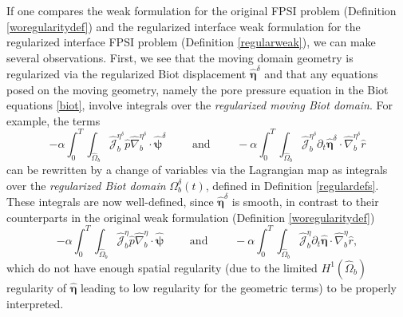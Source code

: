 \documentclass[11pt]{article}
\newcommand{\bd}{\boldsymbol}
\theoremstyle{definition}
\begin{document}
If one compares the weak formulation for the original FPSI problem (Definition \ref{woregularitydef}) and the regularized interface weak formulation for the regularized interface FPSI problem (Definition \ref{regularweak}), we can make several observations. First, we see that the moving domain geometry is regularized via the regularized Biot displacement $\hat{\bd{\eta}}^{\delta}$ and that any equations posed on the moving geometry, namely the pore pressure equation in the Biot equations \eqref{biot}, involve integrals over the \textit{regularized moving Biot domain}. For example, the terms 
\begin{equation*}
-\alpha \int_{0}^{T} \int_{\hat{\Omega}_{b}} \hat{\mathcal{J}}^{\eta^{\delta}}_{b} \hat{p} \hat{\nabla}^{\eta^{\delta}}_{b} \cdot \hat{\bd{\psi}}^{\delta} \qquad \text{ and } \qquad -\alpha \int_{0}^{T} \int_{\hat{\Omega}_{b}} \hat{\mathcal{J}}^{\eta^{\delta}}_{b} \partial_{t} \hat{\bd{\eta}}^{\delta} \cdot \hat{\nabla}^{\eta^{\delta}}_{b} \hat{r}
\end{equation*}
can be rewritten by a change of variables via the Lagrangian map as integrals over the \textit{regularized Biot domain} $\Omega^{\delta}_{b}(t)$, defined in Definition \ref{regulardefs}. These integrals are now well-defined, since $\hat{\bd{\eta}}^{\delta}$ is smooth, in contrast to their counterparts in the original weak formulation (Definition \ref{woregularitydef})
\begin{equation*}
-\alpha \int_{0}^{T} \int_{\hat{\Omega}_{b}} \hat{\mathcal{J}}^{\eta}_{b} \hat{p} \hat{\nabla}^{\eta}_{b} \cdot \hat{\bd{\psi}} \qquad \text{ and } \qquad -\alpha \int_{0}^{T} \int_{\hat{\Omega}_{b}} \hat{\mathcal{J}}^{\eta}_{b} \partial_{t} \hat{\bd{\eta}} \cdot \hat{\nabla}^{\eta}_{b} \hat{r},
\end{equation*}
which do not have enough spatial regularity (due to the limited $H^{1}(\hat{\Omega}_{b})$ regularity of $\hat{\bd{\eta}}$ leading to low regularity for the geometric terms) to be properly interpreted.
\end{document}
